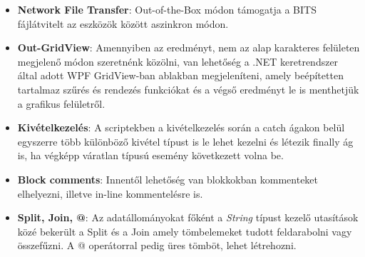 \documentclass[12pt,oneside,justify,table]{book}
\begin{document}
\begin{itemize}
	\item \textbf{Network File Transfer}: Out-of-the-Box módon támogatja a BITS fájlátvitelt az eszközök között aszinkron módon.
	\item \textbf{Out-GridView}: Amennyiben az eredményt, nem az alap karakteres felületen megjelenő módon szeretnénk közölni, van lehetőség a .NET keretrendszer által adott WPF GridView-ban ablakban megjeleníteni, amely beépítetten tartalmaz szűrés és rendezés funkciókat és a végső eredményt le is menthetjük a grafikus felületről.
	\item \textbf{Kivételkezelés}: A scriptekben a kivételkezelés során a catch ágakon belül egyszerre több különböző kivétel típust is le lehet kezelni és létezik finally ág is, ha végképp váratlan típusú esemény következett volna be. 
	\item \textbf{Block comments}: Innentől lehetőség van blokkokban kommenteket elhelyezni, illetve in-line kommentelésre is. 
	\item \textbf{Split, Join, @}: Az adatállományokat főként a \textit{String} típust kezelő utasítások közé bekerült a Split és a Join amely tömbelemeket tudott feldarabolni vagy összefűzni. A @ operátorral pedig üres tömböt, lehet létrehozni.
\end{itemize}
\end{document}
